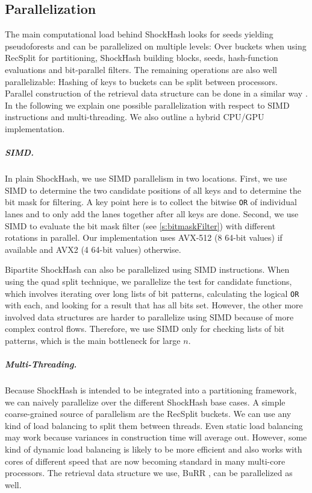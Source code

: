 \documentclass[a4paper,USenglish,cleveref]{lipics-v2021}
\newcommand{\myparagraph}[1]{\subparagraph*{#1}}
\begin{document}
\subsection{Parallelization}\label{ss:parallelization}
The main computational load behind ShockHash looks for seeds yielding pseudoforests and can be parallelized on multiple levels:
Over buckets when using RecSplit for partitioning, ShockHash building blocks, seeds, hash-function evaluations and bit-parallel filters.
The remaining operations are also well parallelizable: Hashing of keys to buckets can be split between processors.
Parallel construction of the retrieval data structure can be done in a similar way \cite{dillinger2022burr}.
In the following we explain one possible parallelization with respect to SIMD instructions and multi-threading.
We also outline a hybrid CPU/GPU implementation.

\myparagraph{SIMD.}
\label{s:simd}
In plain ShockHash, we use SIMD parallelism in two locations.
First, we use SIMD to determine the two candidate positions of all keys and to determine the bit mask for filtering.
A key point here is to collect the bitwise \texttt{OR} of individual lanes and to only add the lanes together after all keys are done.
Second, we use SIMD to evaluate the bit mask filter (see \cref{s:bitmaskFilter}) with different rotations in parallel.
Our implementation uses AVX-512 (8 64-bit values) if available and AVX2 (4 64-bit values) otherwise.

Bipartite ShockHash can also be parallelized using SIMD instructions.
When using the quad split technique, we parallelize the test for candidate functions, which involves iterating over long lists of bit patterns, calculating the logical \texttt{OR} with each, and looking for a result that has all bits set.
However, the other more involved data structures are harder to parallelize using SIMD because of more complex control flows.
Therefore, we use SIMD only for checking lists of bit patterns, which is the main bottleneck for large $n$.

\myparagraph{Multi-Threading.}
Because ShockHash is intended to be integrated into a partitioning framework, we can naively parallelize over the different ShockHash base cases.
A simple coarse-grained source of parallelism are the RecSplit buckets.
We can use any kind of load balancing to split them between threads.
Even static load balancing may work because variances in construction time will average out.
However, some kind of dynamic load balancing is likely to be more efficient and also works with cores of different speed that are now becoming standard in many multi-core processors.
The retrieval data structure we use, BuRR \cite{dillinger2022burr}, can be parallelized as well.
\end{document}
